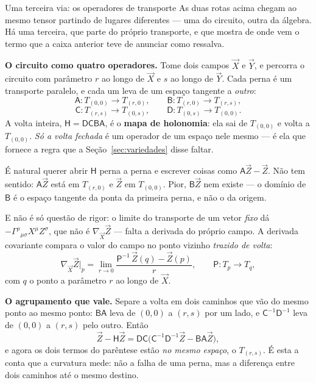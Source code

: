 \documentclass[12pt,a4paper,oneside]{book}
\theoremstyle{rgplain}
\theoremstyle{rgremark}
\begin{document}
\begin{interludio}{Uma terceira via: os operadores de transporte}
As duas rotas acima chegam ao mesmo tensor partindo de lugares diferentes ---
uma do circuito, outra da álgebra. Há uma terceira, que parte do próprio
transporte, e que mostra de onde vem o termo que a caixa anterior teve de
anunciar como ressalva.

\textbf{O circuito como quatro operadores.} Tome dois campos $\vec X$ e
$\vec Y$, e percorra o circuito com parâmetro $r$ ao longo de $\vec X$ e $s$
ao longo de $\vec Y$. Cada perna é um transporte paralelo, e cada um leva de
um espaço tangente a \emph{outro}:
\[
  \mathsf A\colon T_{(0,0)}\to T_{(r,0)}, \qquad
  \mathsf B\colon T_{(r,0)}\to T_{(r,s)},
\]
\[
  \mathsf C\colon T_{(r,s)}\to T_{(0,s)}, \qquad
  \mathsf D\colon T_{(0,s)}\to T_{(0,0)} .
\]
A volta inteira, $\mathsf H=\mathsf{DCBA}$, é o \textbf{mapa de holonomia}:
ela sai de $T_{(0,0)}$ e volta a $T_{(0,0)}$. \emph{Só a volta fechada} é um
operador de um espaço nele mesmo --- é ela que fornece a regra que a
Seção~\ref{sec:variedades} disse faltar.

\begin{atencao}[title={\sffamily\bfseries\footnotesize\color{rgTerracota}A TENTAÇÃO DE SOMAR PELO CAMINHO}]
É natural querer abrir $\mathsf H$ perna a perna e escrever coisas como
$\mathsf A\vec Z-\vec Z$. Não tem sentido: $\mathsf A\vec Z$ está em
$T_{(r,0)}$ e $\vec Z$ em $T_{(0,0)}$. Pior, $\mathsf B\vec Z$ nem existe ---
o domínio de $\mathsf B$ é o espaço tangente da ponta da primeira perna, e
não o da origem.

E não é só questão de rigor: o limite do transporte de um vetor \emph{fixo}
dá $-\Gamma^\rho{}_{\mu\sigma}X^\mu Z^\sigma$, que não é
$\nabla_{\vec X}\vec Z$ --- falta a derivada do próprio campo. A derivada
covariante compara o valor do campo no ponto vizinho \emph{trazido de volta}:
\begin{equation}
  \nabla_{\vec X}\vec Z\big|_p
  =\lim_{r\to0}\frac{\mathsf P^{-1}\,\vec Z(q)-\vec Z(p)}{r} ,
  \qquad \mathsf P\colon T_p\to T_q ,
  \label{eq:nabla-retorno}
\end{equation}
com $q$ o ponto a parâmetro $r$ ao longo de $\vec X$.
\end{atencao}

\textbf{O agrupamento que vale.} Separe a volta em dois caminhos que vão do
mesmo ponto ao mesmo ponto: $\mathsf{BA}$ leva de $(0,0)$ a $(r,s)$ por um
lado, e $\mathsf C^{-1}\mathsf D^{-1}$ leva de $(0,0)$ a $(r,s)$ pelo outro.
Então
\begin{equation}
  \vec Z-\mathsf H\vec Z
  =\mathsf{DC}\bigl(\mathsf C^{-1}\mathsf D^{-1}\vec Z-\mathsf{BA}\vec Z\bigr),
  \label{eq:holonomia-dois-caminhos}
\end{equation}
e agora os dois termos do parêntese estão \emph{no mesmo espaço}, o
$T_{(r,s)}$. É esta a conta que a curvatura mede: não a falha de uma perna,
mas a diferença entre dois caminhos até o mesmo destino.


\end{interludio}
\end{document}
